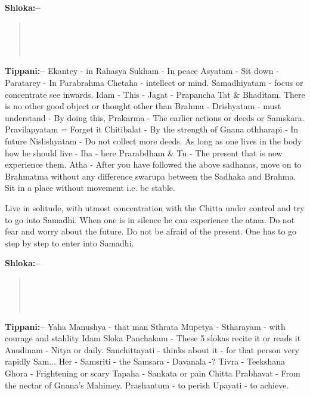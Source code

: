 \textbf{Shloka:–}

\begin{verse}
 \\\\\\ 
\end{verse}

\textbf{Tippani:–} Ekantey - in Rahasya Sukham - In peace Asyatam - Sit down - Paratarey - In Parabrahma Chetaha - intellect or mind. Samadhiyatam - focus or concentrate see inwards. Idam - This - Jagat - Prapancha Tat \& Bhaditam. There is no other good object or thought other than Brahma - Drishyatam - must understand - By doing this, Prakarma - The earlier actions or deeds or Samskara. Pravilapyatam = Forget it Chitibalat - By the strength of Gnana othharapi - In future Nislishyatam - Do not collect more deeds. As long as one lives in the body how he should live - Iha - here Prarabdham \& Tu - The present that is now experience them. Atha - After you have followed the above sadhanas, move on to Brahmatma without any difference swarupa between the Sadhaka and Brahma. Sit in a place without movement i.e. be stable.

Live in solitude, with utmost concentration with the Chitta under control and try to go into Samadhi. When one is in silence he can experience the atma. Do not fear and worry about the future. Do not be afraid of the present. One has to go step by step to enter into Samadhi.

\textbf{Shloka:–}

\begin{verse}
 \\\\\\
\end{verse}

\textbf{Tippani:–} Yaha Manushya - that man Sthrata Mupetya - Stharayam - with courage and stahlity Idam Sloka Panchakam - These 5 slokas recite it or reads it Anudinam - Nitya or daily. Sanchittayati - thinks about it - for that person very rapidly Sam... Her - Samsriti - the Samsara - Davanala -? Tivra - Teekshana Ghora - Frightening or scary Tapaha - Sankata or pain Chitta Prabhavat - From the nectar of Gnana's Mahimey. Prashantum - to perish Upayati - to achieve.

